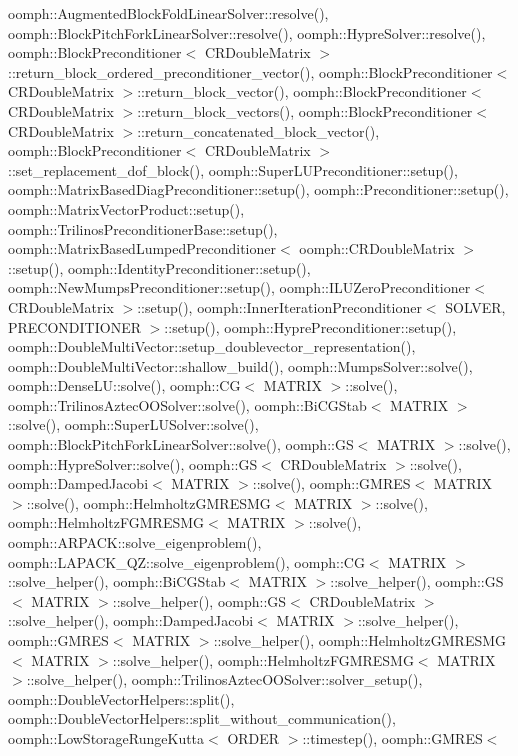 oomph\+::\+Augmented\+Block\+Fold\+Linear\+Solver\+::resolve(), oomph\+::\+Block\+Pitch\+Fork\+Linear\+Solver\+::resolve(), oomph\+::\+Hypre\+Solver\+::resolve(), oomph\+::\+Block\+Preconditioner$<$ C\+R\+Double\+Matrix $>$\+::return\+\_\+block\+\_\+ordered\+\_\+preconditioner\+\_\+vector(), oomph\+::\+Block\+Preconditioner$<$ C\+R\+Double\+Matrix $>$\+::return\+\_\+block\+\_\+vector(), oomph\+::\+Block\+Preconditioner$<$ C\+R\+Double\+Matrix $>$\+::return\+\_\+block\+\_\+vectors(), oomph\+::\+Block\+Preconditioner$<$ C\+R\+Double\+Matrix $>$\+::return\+\_\+concatenated\+\_\+block\+\_\+vector(), oomph\+::\+Block\+Preconditioner$<$ C\+R\+Double\+Matrix $>$\+::set\+\_\+replacement\+\_\+dof\+\_\+block(), oomph\+::\+Super\+L\+U\+Preconditioner\+::setup(), oomph\+::\+Matrix\+Based\+Diag\+Preconditioner\+::setup(), oomph\+::\+Preconditioner\+::setup(), oomph\+::\+Matrix\+Vector\+Product\+::setup(), oomph\+::\+Trilinos\+Preconditioner\+Base\+::setup(), oomph\+::\+Matrix\+Based\+Lumped\+Preconditioner$<$ oomph\+::\+C\+R\+Double\+Matrix $>$\+::setup(), oomph\+::\+Identity\+Preconditioner\+::setup(), oomph\+::\+New\+Mumps\+Preconditioner\+::setup(), oomph\+::\+I\+L\+U\+Zero\+Preconditioner$<$ C\+R\+Double\+Matrix $>$\+::setup(), oomph\+::\+Inner\+Iteration\+Preconditioner$<$ S\+O\+L\+V\+E\+R, P\+R\+E\+C\+O\+N\+D\+I\+T\+I\+O\+N\+E\+R $>$\+::setup(), oomph\+::\+Hypre\+Preconditioner\+::setup(), oomph\+::\+Double\+Multi\+Vector\+::setup\+\_\+doublevector\+\_\+representation(), oomph\+::\+Double\+Multi\+Vector\+::shallow\+\_\+build(), oomph\+::\+Mumps\+Solver\+::solve(), oomph\+::\+Dense\+L\+U\+::solve(), oomph\+::\+C\+G$<$ M\+A\+T\+R\+I\+X $>$\+::solve(), oomph\+::\+Trilinos\+Aztec\+O\+O\+Solver\+::solve(), oomph\+::\+Bi\+C\+G\+Stab$<$ M\+A\+T\+R\+I\+X $>$\+::solve(), oomph\+::\+Super\+L\+U\+Solver\+::solve(), oomph\+::\+Block\+Pitch\+Fork\+Linear\+Solver\+::solve(), oomph\+::\+G\+S$<$ M\+A\+T\+R\+I\+X $>$\+::solve(), oomph\+::\+Hypre\+Solver\+::solve(), oomph\+::\+G\+S$<$ C\+R\+Double\+Matrix $>$\+::solve(), oomph\+::\+Damped\+Jacobi$<$ M\+A\+T\+R\+I\+X $>$\+::solve(), oomph\+::\+G\+M\+R\+E\+S$<$ M\+A\+T\+R\+I\+X $>$\+::solve(), oomph\+::\+Helmholtz\+G\+M\+R\+E\+S\+M\+G$<$ M\+A\+T\+R\+I\+X $>$\+::solve(), oomph\+::\+Helmholtz\+F\+G\+M\+R\+E\+S\+M\+G$<$ M\+A\+T\+R\+I\+X $>$\+::solve(), oomph\+::\+A\+R\+P\+A\+C\+K\+::solve\+\_\+eigenproblem(), oomph\+::\+L\+A\+P\+A\+C\+K\+\_\+\+Q\+Z\+::solve\+\_\+eigenproblem(), oomph\+::\+C\+G$<$ M\+A\+T\+R\+I\+X $>$\+::solve\+\_\+helper(), oomph\+::\+Bi\+C\+G\+Stab$<$ M\+A\+T\+R\+I\+X $>$\+::solve\+\_\+helper(), oomph\+::\+G\+S$<$ M\+A\+T\+R\+I\+X $>$\+::solve\+\_\+helper(), oomph\+::\+G\+S$<$ C\+R\+Double\+Matrix $>$\+::solve\+\_\+helper(), oomph\+::\+Damped\+Jacobi$<$ M\+A\+T\+R\+I\+X $>$\+::solve\+\_\+helper(), oomph\+::\+G\+M\+R\+E\+S$<$ M\+A\+T\+R\+I\+X $>$\+::solve\+\_\+helper(), oomph\+::\+Helmholtz\+G\+M\+R\+E\+S\+M\+G$<$ M\+A\+T\+R\+I\+X $>$\+::solve\+\_\+helper(), oomph\+::\+Helmholtz\+F\+G\+M\+R\+E\+S\+M\+G$<$ M\+A\+T\+R\+I\+X $>$\+::solve\+\_\+helper(), oomph\+::\+Trilinos\+Aztec\+O\+O\+Solver\+::solver\+\_\+setup(), oomph\+::\+Double\+Vector\+Helpers\+::split(), oomph\+::\+Double\+Vector\+Helpers\+::split\+\_\+without\+\_\+communication(), oomph\+::\+Low\+Storage\+Runge\+Kutta$<$ O\+R\+D\+E\+R $>$\+::timestep(), oomph\+::\+G\+M\+R\+E\+S$<$ 